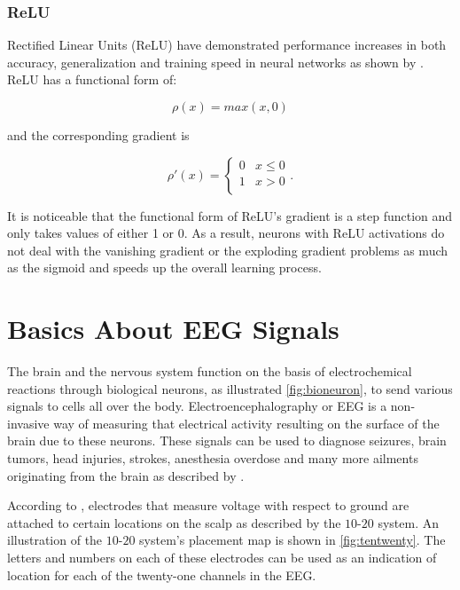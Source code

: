 \subsubsection*{ReLU}

Rectified Linear Units (ReLU) have demonstrated performance increases in both accuracy, generalization and training speed in neural networks as shown by \citet{dahl2013improving}. ReLU has a functional form of:

\begin{equation}
	\rho(x) = max(x, 0)
\end{equation}

\noindent
and the corresponding gradient is 

\begin{equation}
	\rho'(x) =  \begin{cases} 
		
	0 & x \leq 0 \\
	1 & x > 0 \\
	\end{cases}.
\end{equation}

\noindent It is noticeable that the functional form of ReLU's gradient is a step function and only takes values of either 1 or 0. As a result, neurons with ReLU activations do not deal with the vanishing gradient or the exploding gradient problems as much as the sigmoid and speeds up the overall learning process. 

\section{Basics About EEG Signals}

The brain and the nervous system function on the basis of electrochemical reactions through biological neurons, as illustrated \cref{fig:bioneuron}, to send various signals to cells all over the body. Electroencephalography or EEG is a non-invasive way of measuring that electrical activity resulting on the surface of the brain due to these neurons. These signals can be used to diagnose seizures, brain tumors, head injuries, strokes, anesthesia overdose and many more ailments originating from the brain as described by \citet{mayo_eegs}.

According to \citet{eegs_info}, electrodes that measure voltage with respect to ground are attached to certain locations on the scalp as described by the $10$-$20$ system. An illustration of the $10$-$20$ system's placement map is shown in \cref{fig:tentwenty}. The letters and numbers on each of these electrodes can be used as an indication of location for each of the twenty-one channels in the EEG. 

